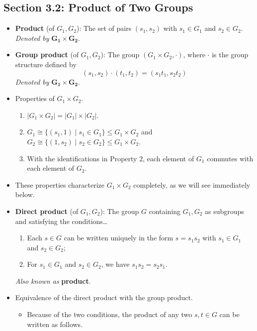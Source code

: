 \documentclass[../notes.tex]{subfiles}
\begin{document}
\subsection*{Section 3.2: Product of Two Groups}
\begin{itemize}
    \item \textbf{Product} (of $G_1,G_2$): The set of pairs $(s_1,s_2)$ with $s_1\in G_1$ and $s_2\in G_2$. \emph{Denoted by} $\bm{G_1\times G_2}$.
    \item \textbf{Group product} (of $G_1,G_2$): The group $(G_1\times G_2,\cdot)$, where $\cdot$ is the group structure defined by
    \begin{equation*}
        (s_1,s_2)\cdot(t_1,t_2) = (s_1t_1,s_2t_2)
    \end{equation*}
    \emph{Denoted by} $\bm{G_1\times G_2}$.
    \item Properties of $G_1\times G_2$.
    \begin{enumerate}
        \item $|G_1\times G_2|=|G_1|\times|G_2|$.
        \item $G_1\cong\{(s_1,1)\mid s_1\in G_1\}\leq G_1\times G_2$ and $G_2\cong\{(1,s_2)\mid s_2\in G_2\}\leq G_1\times G_2$.
        \item With the identifications in Property 2, each element of $G_1$ commutes with each element of $G_2$.
    \end{enumerate}
    \item These properties characterize $G_1\times G_2$ completely, as we will see immediately below.
    \item \textbf{Direct product} (of $G_1,G_2$): The group $G$ containing $G_1,G_2$ as subgroups and satisfying the conditions\dots
    \begin{enumerate}[label={\textup{(\roman*)}}]
        \item Each $s\in G$ can be written uniquely in the form $s=s_1s_2$ with $s_1\in G_1$ and $s_2\in G_2$;
        \item For $s_1\in G_1$ and $s_2\in G_2$, we have $s_1s_2=s_2s_1$.
    \end{enumerate}
    \emph{Also known as} \textbf{product}.
    \item Equivalence of the direct product with the group product.
    \begin{itemize}
        \item Because of the two conditions, the product of any two $s,t\in G$ can be written as follows.
        \begin{align*}

\end{align*}
\end{itemize}
\end{itemize}
\end{document}
